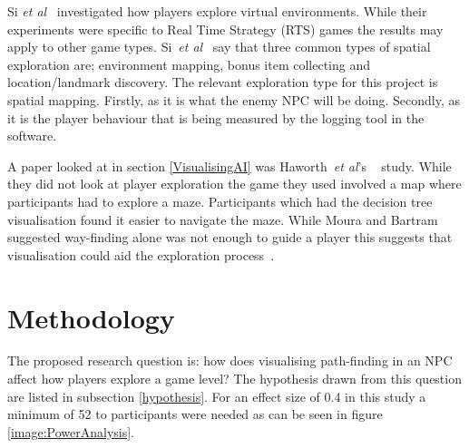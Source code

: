 \documentclass[journal]{IEEEtran}
\begin{document}
Si \textit{et al}~\cite{si2017} investigated how players explore virtual environments. While their experiments were specific to Real Time Strategy (RTS) games the results may apply to other game types. Si~\textit{et al}~\cite{si2017} say that three common types of spatial exploration are; environment mapping, bonus item collecting and location/landmark discovery. The relevant exploration type for this project is spatial mapping. Firstly, as it is what the enemy NPC will be doing.  Secondly, as it is the player behaviour that is being measured by the logging tool in the software.

A paper looked at in section \ref{VisualisingAI} was Haworth~\textit{et al}'s ~\cite{Haworth2010} study. While they did not look at player exploration the game they used involved a map where participants had to explore a maze. Participants which had the decision tree visualisation found it easier to navigate the maze. While Moura and Bartram~\cite{moura2014} suggested way-finding alone was not enough to guide a player this suggests that visualisation could aid the exploration process~\cite{Haworth2010}.

\section{Methodology} \label{methodology}
The proposed research question is: how does visualising path-finding in an NPC affect how players explore a game level? The hypothesis drawn from this question are listed in subsection \ref{hypothesis}.  For an effect size of 0.4 in this study a minimum of  52 to participants were needed as can be seen in figure \ref{image:PowerAnalysis}. 
\end{document}
